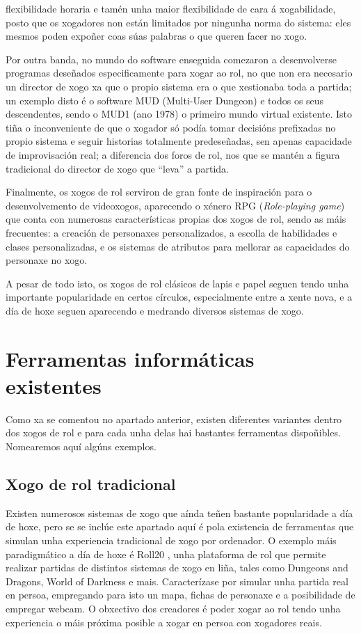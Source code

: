 flexibilidade horaria e tamén unha maior flexibilidade de cara á xogabilidade,
posto que os xogadores non están limitados por ningunha norma do sistema: eles
mesmos poden expoñer coas súas palabras o que queren facer no xogo.
\par
Por outra banda, no mundo do software enseguida comezaron a desenvolverse
programas deseñados especificamente para xogar ao rol, no que non era necesario
un director de xogo xa que o propio sistema era o que xestionaba toda a partida;
un exemplo disto é o software MUD (Multi-User Dungeon) e todos os seus
descendentes, sendo o MUD1 (ano 1978) o primeiro mundo virtual
existente\cite{mud}.
Isto tiña o inconveniente de que o xogador só podía tomar decisións prefixadas no
propio sistema e seguir historias totalmente predeseñadas, sen apenas capacidade
de improvisación real; a diferencia dos foros de rol, nos que se mantén a
figura tradicional do director de xogo que ``leva'' a partida.
\par
Finalmente, os xogos de rol serviron de gran fonte de inspiración para o
desenvolvemento de videoxogos, aparecendo o xénero RPG ({\it Role-playing
game}) que conta con numerosas características propias dos xogos de rol, sendo
as máis frecuentes: a creación de personaxes personalizados, a escolla de
habilidades e clases personalizadas, e os sistemas de atributos para mellorar as
capacidades do personaxe no xogo.
\par
A pesar de todo isto, os xogos de rol clásicos de lapis e papel seguen tendo
unha importante popularidade en certos círculos, especialmente entre a xente
nova, e a día de hoxe seguen aparecendo e medrando diversos sistemas de xogo.

\section{Ferramentas informáticas existentes}
Como xa se comentou no apartado anterior, existen diferentes variantes dentro
dos xogos de rol e para cada unha delas hai bastantes ferramentas dispoñibles.
Nomearemos aquí algúns exemplos.
\subsection{Xogo de rol tradicional}
Existen numerosos sistemas de xogo que aínda teñen bastante popularidade a día
de hoxe, pero se se inclúe este apartado aquí é pola existencia de ferramentas
que simulan unha experiencia tradicional de xogo por ordenador. O exemplo máis
paradigmático a día de hoxe é Roll20 \cite{roll20}, unha plataforma de rol que
permite realizar partidas de distintos sistemas de xogo en liña, tales como
Dungeons and Dragons, World of Darkness e mais. Caracterízase por simular unha
partida real en persoa, empregando para isto un mapa, fichas de personaxe e a
posibilidade de empregar webcam. O obxectivo dos creadores é poder xogar ao rol
tendo unha experiencia o máis próxima posible a xogar en persoa con xogadores
reais.

